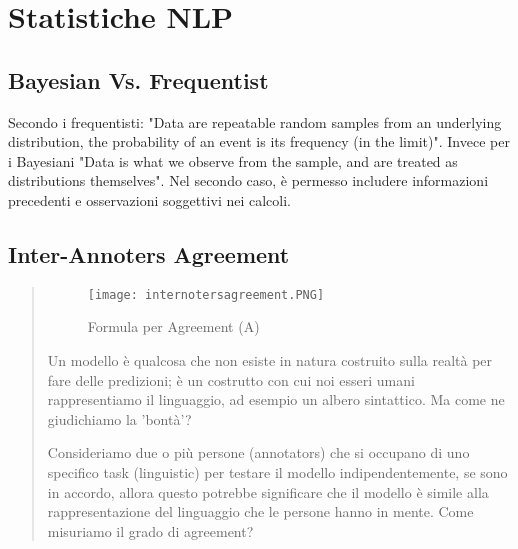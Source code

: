 \chapter{Statistiche NLP}
\section{Bayesian Vs. Frequentist}
Secondo i frequentisti: "Data are repeatable random samples from an underlying distribution, the probability of an event is its frequency (in the limit)". Invece per i Bayesiani "Data is what we observe
from the sample, and are treated as distributions themselves".
Nel secondo caso, è permesso includere informazioni precedenti e osservazioni soggettivi nei calcoli.

\section{Inter-Annoters Agreement}

\begin{abstract}

\begin{figure}
    \centering
    \texttt{[image: internotersagreement.PNG]}
    \caption{Formula per Agreement (A)}
    \label{fig:enter-label}
\end{figure}

Un modello è qualcosa che non esiste in natura costruito sulla realtà per fare delle predizioni; è un costrutto con cui noi esseri umani rappresentiamo il linguaggio, ad esempio un albero sintattico. Ma come ne giudichiamo la 'bontà'?

Consideriamo due o più persone (annotators) che si occupano di uno specifico task (linguistic) per testare il modello indipendentemente, se sono in accordo, allora questo potrebbe significare che il modello è simile alla rappresentazione del linguaggio che le persone hanno in mente. Come misuriamo il grado di agreement?

\end{abstract}

